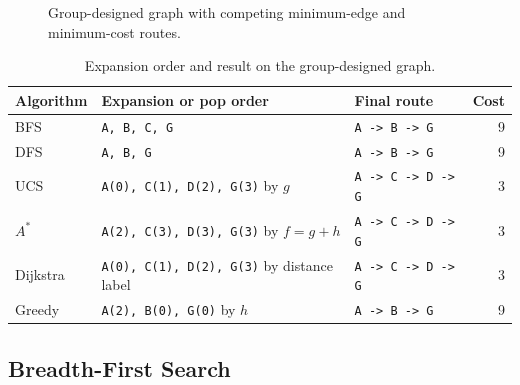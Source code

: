 \documentclass[12pt,a4paper]{article}
\begin{document}
\begin{figure}[H]
    \centering
    \caption{Group-designed graph with competing minimum-edge and minimum-cost routes.}
    \label{fig:example-graph}
\end{figure}

\begin{table}[H]
    \centering
    \caption{Expansion order and result on the group-designed graph.}
    \label{tab:example-results}
    \renewcommand{\arraystretch}{1.12}
    \scriptsize
    \begin{tabularx}{\textwidth}{P{2cm} Y P{3.7cm} r}
        \toprule
        \textbf{Algorithm} & \textbf{Expansion or pop order} &
        \textbf{Final route} & \textbf{Cost} \\
        \midrule
        BFS & \texttt{A, B, C, G} & \texttt{A -> B -> G} & 9 \\
        DFS & \texttt{A, B, G} & \texttt{A -> B -> G} & 9 \\
        UCS & \texttt{A(0), C(1), D(2), G(3)} by $g$ &
        \texttt{A -> C -> D -> G} & 3 \\
        $A^*$ & \texttt{A(2), C(3), D(3), G(3)} by $f=g+h$ &
        \texttt{A -> C -> D -> G} & 3 \\
        Dijkstra & \texttt{A(0), C(1), D(2), G(3)} by distance label &
        \texttt{A -> C -> D -> G} & 3 \\
        Greedy & \texttt{A(2), B(0), G(0)} by $h$ &
        \texttt{A -> B -> G} & 9 \\
        \bottomrule
    \end{tabularx}
\end{table}

\subsection{Breadth-First Search}
\end{document}
